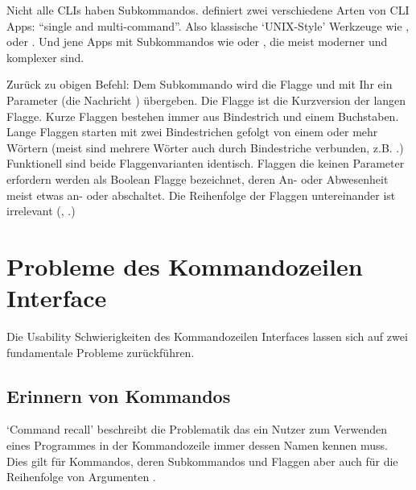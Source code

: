 \documentclass[oneside,bibliography=totocnumbered,BCOR=5mm]{scrbook}
\begin{document}
\smallskip

Nicht alle CLIs haben Subkommandos. \textcite{12factor} definiert zwei verschiedene
Arten von CLI Apps: ``single and multi-command''. Also klassische `UNIX-Style'
Werkzeuge wie ,  oder . Und jene
Apps mit Subkommandos wie  oder , die meist
moderner und komplexer sind.

\smallskip

Zurück zu obigen  Befehl: Dem  Subkommando
wird die  Flagge und mit Ihr ein Parameter (die Nachricht
) übergeben. Die  Flagge ist die
Kurzversion der langen  Flagge. Kurze Flaggen bestehen
immer aus Bindestrich und einem Buchstaben. Lange Flaggen starten mit zwei
Bindestrichen gefolgt von einem oder mehr Wörtern (meist sind mehrere Wörter
auch durch Bindestriche verbunden, z.B. .)
Funktionell sind beide Flaggenvarianten identisch. Flaggen die keinen Parameter
erfordern werden als Boolean Flagge bezeichnet, deren An- oder Abwesenheit
meist etwas an- oder abschaltet. Die Reihenfolge der Flaggen untereinander ist
irrelevant (\textcite{nagarajan2018}, \textcite{clig}.)

\chapter{Probleme des Kommandozeilen Interface}
\label{sec:cli-problems}

Die Usability Schwierigkeiten des Kommandozeilen Interfaces lassen sich auf zwei
fundamentale Probleme zurückführen.

\section{Erinnern von Kommandos}

`Command recall' beschreibt die Problematik das ein Nutzer zum Verwenden eines
Programmes in der Kommandozeile immer dessen Namen kennen muss. Dies gilt für
Kommandos, deren Subkommandos und Flaggen aber auch für die Reihenfolge von
Argumenten \parencite{Raskin_2008}.

\bigskip

\newcommand{\refcr}[1]{\hyperref[prob:cr]{#1}}
\newcommand{\refcrr}{\hyperref[prob:cr]{`Command Recall'}}
\end{document}
